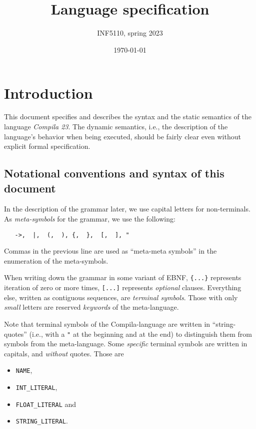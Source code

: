 \documentclass[11pt]{article}
\author{INF5110, spring 2023}
\date{\today}
\title{\\\medskip
\large Language specification}
\begin{document}
\tableofcontents



\section{Introduction}
\label{sec:orgdf14c52}

This document specifies and describes the syntax and the static semantics
of the language \emph{Compila 23}.  The dynamic semantics, i.e., the description
of the language's behavior when being executed, should be fairly clear even
without explicit formal specification. 





\subsection{Notational conventions and syntax of this document}
\label{sec:org19282bb}

In the description of the grammar later, we use capital letters for
non-terminals. As \emph{meta-symbols} for the grammar, we use the following:


\begin{verbatim}
   ->,  |,  (,  ), {,  },  [,  ], "  
\end{verbatim}

Commas in the previous line are used as ``meta-meta symbols'' in the
enumeration of the meta-symbols.



When writing down the grammar in some variant of EBNF, \texttt{\{...\}} represents
iteration of zero or more times, \texttt{[...]} represents \emph{optional}
clauses. Everything else, written as contiguous sequences, are \emph{terminal
symbols}. Those with only \emph{small} letters are reserved \emph{keywords} of the
meta-language.

Note that terminal symbols of the Compila-language are written in
``string-quotes'' (i.e., with a \texttt{"} at the beginning and at the end) to
distinguish them from symbols from the meta-language. Some \emph{specific}
terminal symbols are written in capitals, and \emph{without} quotes.  Those are
\begin{itemize}
\item \texttt{NAME},
\item \texttt{INT\_LITERAL},
\item \texttt{FLOAT\_LITERAL} and
\item \texttt{STRING\_LITERAL}.
\end{itemize}
\end{document}

